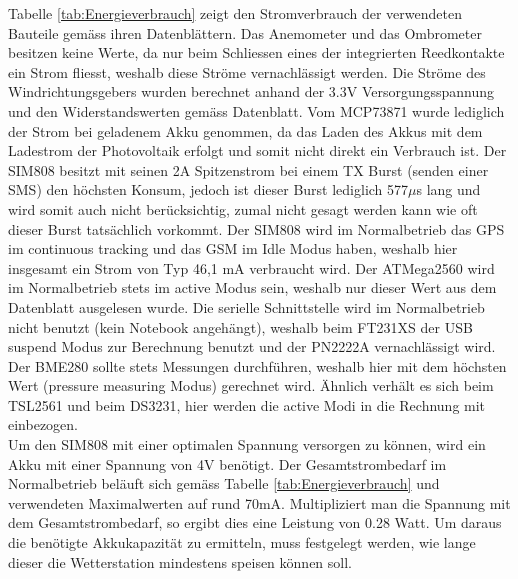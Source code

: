 \newpage
Tabelle \ref{tab:Energieverbrauch} zeigt den Stromverbrauch der verwendeten Bauteile gemäss ihren Datenblättern. Das Anemometer und das Ombrometer besitzen keine Werte, da nur beim Schliessen eines der integrierten Reedkontakte ein Strom fliesst, weshalb diese Ströme vernachlässigt werden. Die Ströme des Windrichtungsgebers wurden berechnet anhand der 3.3V Versorgungsspannung und den Widerstandswerten gemäss Datenblatt. Vom MCP73871 wurde lediglich der Strom bei geladenem Akku genommen, da das Laden des Akkus mit dem Ladestrom der Photovoltaik erfolgt und somit nicht direkt ein Verbrauch ist. Der SIM808 besitzt mit seinen 2A Spitzenstrom bei einem TX Burst (senden einer SMS) den höchsten Konsum, jedoch ist dieser Burst lediglich 577$\mu$s lang und wird somit auch nicht berücksichtig, zumal nicht gesagt werden kann wie oft dieser Burst tatsächlich vorkommt. Der SIM808 wird im Normalbetrieb das GPS im continuous tracking und das GSM im Idle Modus haben, weshalb hier insgesamt ein Strom von Typ 46,1 mA verbraucht wird. Der ATMega2560 wird im Normalbetrieb stets im active Modus sein, weshalb nur dieser Wert aus dem Datenblatt ausgelesen wurde. Die serielle Schnittstelle wird im Normalbetrieb nicht benutzt (kein Notebook angehängt), weshalb beim FT231XS der USB suspend Modus zur Berechnung benutzt und der PN2222A vernachlässigt wird. Der BME280 sollte stets Messungen durchführen, weshalb hier mit dem höchsten Wert (pressure measuring Modus) gerechnet wird. Ähnlich verhält es sich beim TSL2561 und beim DS3231, hier werden die active Modi in die Rechnung mit einbezogen.\\[0.5cm]
Um den SIM808 mit einer optimalen Spannung versorgen zu können, wird ein Akku mit einer Spannung von 4V benötigt. Der Gesamtstrombedarf im Normalbetrieb beläuft sich gemäss Tabelle \ref{tab:Energieverbrauch} und verwendeten Maximalwerten auf rund 70mA. Multipliziert man die Spannung mit dem Gesamtstrombedarf, so ergibt dies eine Leistung von 0.28 Watt. Um daraus die benötigte Akkukapazität zu ermitteln, muss festgelegt werden, wie lange dieser die Wetterstation mindestens speisen können soll. 